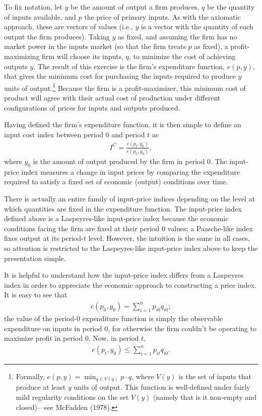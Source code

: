 \documentclass[]{article}
\begin{document}
To fix notation, let \(y\) be the amount of output a firm produces, \(q\) be the quantity of inputs available, and \(p\) the price of primary inputs. As with the axiomatic approach, these are vectors of values (i.e., \(y\) is a vector with the quantity of each output the firm produces). Taking \(y\) as fixed, and assuming the firm has no market power in the inputs market (so that the firm treats \(p\) as fixed), a profit-maximizing firm will choose its inputs, \(q\), to minimize the cost of achieving outputs \(y\). The result of this exercise is the firm's expenditure function, \(e(p, y)\), that gives the minimum cost for purchasing the inputs required to produce \(y\) units of output.\footnote{Formally, \(e(p, y) = \min_{q \in V(y)} p \cdot q\), where \(V(y)\) is the set of inputs that produce at least \(y\) units of output. This function is well-defined under fairly mild regularity conditions on the set \(V(y)\) (namely that is it non-empty and closed)---see McFadden (1978).} Because the firm is a profit-maximizer, this minimum cost of product will agree with their actual cost of production under different configurations of prices for inputs and outputs produced.

Having defined the firm's expenditure function, it is then simple to define an input cost index between period 0 and period \(t\) as
\begin{align*}
I^{C} = \frac{e(p_{t}, y_{0})}{e(p_{0}, y_{0})},
\end{align*}
where \(y_{0}\) is the amount of output produced by the firm in period 0. The input-price index measures a change in input prices by comparing the expenditure required to satisfy a fixed set of economic (output) conditions over time.

There is actually an entire family of input-price indices depending on the level at which quantities are fixed in the expenditure function. The input-price index defined above is a Laspeyres-like input-price index because the economic conditions facing the firm are fixed at their period 0 values; a Paasche-like index fixes output at its period-\(t\) level. However, the intuition is the same in all cases, so attention is restricted to the Laspeyres-like input-price index above to keep the presentation simple.

It is helpful to understand how the input-price index differs from a Laspeyres index in order to appreciate the economic approach to constructing a price index. It is easy to see that
\begin{align*}
e(p_{0}, y_{0}) = \sum_{i = 1}^{n} p_{i0} q_{i0};
\end{align*}
the value of the period-0 expenditure function is simply the observable expenditure on inputs in period 0, for otherwise the firm couldn't be operating to maximize profit in period 0. Now, in period \(t\),
\begin{align*}
e(p_{t}, y_{0}) \leq \sum_{i = 1}^{n} p_{it} q_{i0}.
\end{align*}
\end{document}
